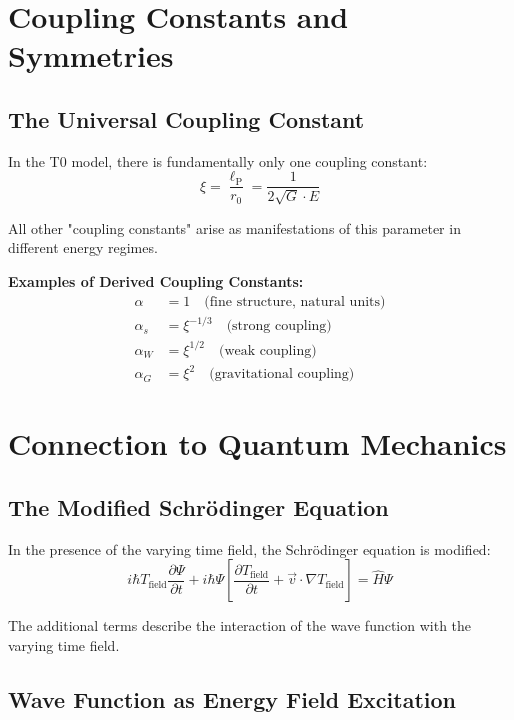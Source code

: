 \documentclass[12pt,a4paper]{report}
\newcommand{\lP}{\ell_{\text{P}}}         %
\newcommand{\rzero}{r_0}                  %
\newcommand{\alphafine}{\alpha}          %
\begin{document}
	\section{Coupling Constants and Symmetries}
	
	\subsection{The Universal Coupling Constant}
	
	In the T0 model, there is fundamentally only one coupling constant:
	\begin{equation}
		\xi = \frac{\lP}{\rzero} = \frac{1}{2\sqrt{G} \cdot E}
	\end{equation}
	
	All other "coupling constants" arise as manifestations of this parameter in different energy regimes.
	
	\textbf{Examples of Derived Coupling Constants:}
	\begin{align}
		\alphafine &= 1 \quad \text{(fine structure, natural units)} \\
		\alpha_s &= \xi^{-1/3} \quad \text{(strong coupling)} \\
		\alpha_W &= \xi^{1/2} \quad \text{(weak coupling)} \\
		\alpha_G &= \xi^2 \quad \text{(gravitational coupling)}
	\end{align}
	
	\section{Connection to Quantum Mechanics}
	
	\subsection{The Modified Schrödinger Equation}
	
	In the presence of the varying time field, the Schrödinger equation is modified:
	\begin{equation}
		\boxed{i\hbar T_{\text{field}} \frac{\partial\Psi}{\partial t} + i\hbar\Psi\left[\frac{\partial T_{\text{field}}}{\partial t} + \vec{v} \cdot \nabla T_{\text{field}}\right] = \hat{H}\Psi}
		\label{eq:modified_schrodinger}
	\end{equation}
	
	The additional terms describe the interaction of the wave function with the varying time field.
	
	\subsection{Wave Function as Energy Field Excitation}
	
\end{document}
